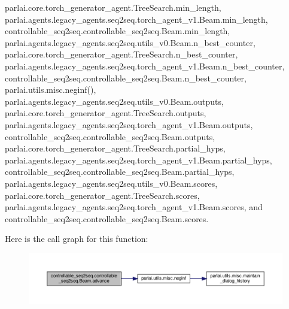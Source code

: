 parlai.\+core.\+torch\+\_\+generator\+\_\+agent.\+Tree\+Search.\+min\+\_\+length, parlai.\+agents.\+legacy\+\_\+agents.\+seq2seq.\+torch\+\_\+agent\+\_\+v1.\+Beam.\+min\+\_\+length, controllable\+\_\+seq2seq.\+controllable\+\_\+seq2seq.\+Beam.\+min\+\_\+length, parlai.\+agents.\+legacy\+\_\+agents.\+seq2seq.\+utils\+\_\+v0.\+Beam.\+n\+\_\+best\+\_\+counter, parlai.\+core.\+torch\+\_\+generator\+\_\+agent.\+Tree\+Search.\+n\+\_\+best\+\_\+counter, parlai.\+agents.\+legacy\+\_\+agents.\+seq2seq.\+torch\+\_\+agent\+\_\+v1.\+Beam.\+n\+\_\+best\+\_\+counter, controllable\+\_\+seq2seq.\+controllable\+\_\+seq2seq.\+Beam.\+n\+\_\+best\+\_\+counter, parlai.\+utils.\+misc.\+neginf(), parlai.\+agents.\+legacy\+\_\+agents.\+seq2seq.\+utils\+\_\+v0.\+Beam.\+outputs, parlai.\+core.\+torch\+\_\+generator\+\_\+agent.\+Tree\+Search.\+outputs, parlai.\+agents.\+legacy\+\_\+agents.\+seq2seq.\+torch\+\_\+agent\+\_\+v1.\+Beam.\+outputs, controllable\+\_\+seq2seq.\+controllable\+\_\+seq2seq.\+Beam.\+outputs, parlai.\+core.\+torch\+\_\+generator\+\_\+agent.\+Tree\+Search.\+partial\+\_\+hyps, parlai.\+agents.\+legacy\+\_\+agents.\+seq2seq.\+torch\+\_\+agent\+\_\+v1.\+Beam.\+partial\+\_\+hyps, controllable\+\_\+seq2seq.\+controllable\+\_\+seq2seq.\+Beam.\+partial\+\_\+hyps, parlai.\+agents.\+legacy\+\_\+agents.\+seq2seq.\+utils\+\_\+v0.\+Beam.\+scores, parlai.\+core.\+torch\+\_\+generator\+\_\+agent.\+Tree\+Search.\+scores, parlai.\+agents.\+legacy\+\_\+agents.\+seq2seq.\+torch\+\_\+agent\+\_\+v1.\+Beam.\+scores, and controllable\+\_\+seq2seq.\+controllable\+\_\+seq2seq.\+Beam.\+scores.

Here is the call graph for this function\+:
\nopagebreak
\begin{figure}[H]
\begin{center}
\leavevmode
\includegraphics[width=350pt]{classcontrollable__seq2seq_1_1controllable__seq2seq_1_1Beam_aaabdc74d8e5ffec4cd92b7fd350aaaf4_cgraph}
\end{center}
\end{figure}
\mbox{\label{classcontrollable__seq2seq_1_1controllable__seq2seq_1_1Beam_a44d2a312bb404a444f077a19a759cd77}} 
